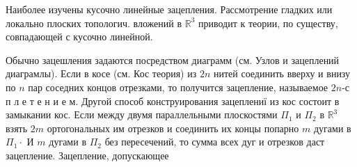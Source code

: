 \documentclass[10pt]{article}
\begin{document}
Наиболее изучены кусочно линейные зацепления. Рассмотрение гладких или локально плоских топологич. вложений в $\mathbb{R}^{3}$ приводит к теории, по существу, совпадающей с кусочно линейной.



Обычно зацешления задаются посредством диаграмм (см. Узлов и зацеплений диаграмлы). Если в косе (см. Кос теория) из $2 n$ нитей соединить вверху и внизу по $n$ пар соседних концов отрезками, то получится зацепление, называемое $2 n$-с п л е т е н и е м. Другой способ конструирования зацеплениї из кос состоит в замыкании кос. Если между двумя параллельными плоскостями $\Pi_{1}$ и $\Pi_{2}$ в $\mathbb{R}^{3}$ взять $2 m$ ортогональных им отрезков и соединить их концы попарно $m$ дугами в $\Pi_{1} \cdot$ И $m$ дугами в $\Pi_{2}$ без пересечений, то сумма всех дуг и отрезков даст зацепление. Зацепление, допускающее
\end{document}
